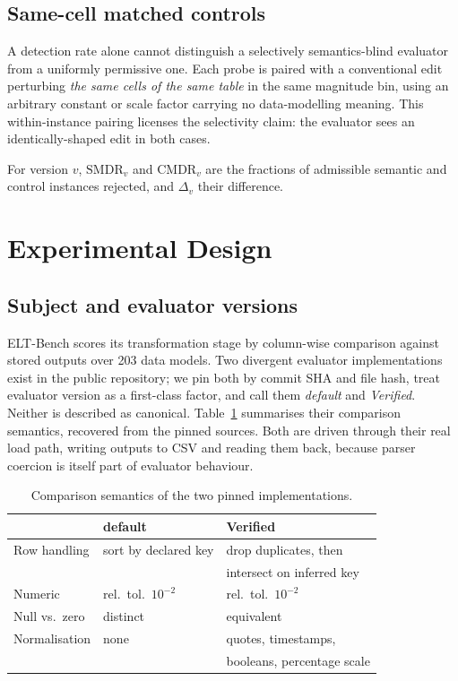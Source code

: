 \documentclass[10pt,conference]{IEEEtran}
\begin{document}
\subsection{Same-cell matched controls}

A detection rate alone cannot distinguish a selectively semantics-blind evaluator
from a uniformly permissive one. Each probe is paired with a conventional edit
\cite{tuya} perturbing \emph{the same cells of the same table} in the same
magnitude bin, using an arbitrary constant or scale factor carrying no
data-modelling meaning. This within-instance pairing licenses the selectivity
claim: the evaluator sees an identically-shaped edit in both cases.

For version $v$, $\mathrm{SMDR}_v$ and $\mathrm{CMDR}_v$ are the fractions of
admissible semantic and control instances rejected, and $\Delta_v$ their
difference.

\section{Experimental Design}

\subsection{Subject and evaluator versions}

ELT-Bench \cite{eltbench} scores its transformation stage by column-wise
comparison against stored outputs over 203 data models. Two divergent evaluator
implementations exist in the public repository; we pin both by commit SHA and file
hash, treat evaluator version as a first-class factor, and call them
\emph{default} and \emph{Verified}. Neither is described as canonical.
Table~\ref{tab:evals} summarises their comparison semantics, recovered from the
pinned sources. Both are driven through their real load path, writing outputs to
CSV and reading them back, because parser coercion is itself part of evaluator
behaviour.

\begin{table}[t]
\caption{Comparison semantics of the two pinned implementations.}
\label{tab:evals}
\centering\footnotesize
\begin{tabular}{@{}lll@{}}
\toprule
& \textbf{default} & \textbf{Verified} \\
\midrule
Row handling & sort by declared key & drop duplicates, then \\
             &                      & intersect on inferred key \\
Numeric      & rel.\ tol.\ $10^{-2}$ & rel.\ tol.\ $10^{-2}$ \\
Null vs.\ zero & distinct & equivalent \\
Normalisation & none & quotes, timestamps, \\
              &      & booleans, percentage scale \\
\bottomrule
\end{tabular}
\end{table}
\end{document}
